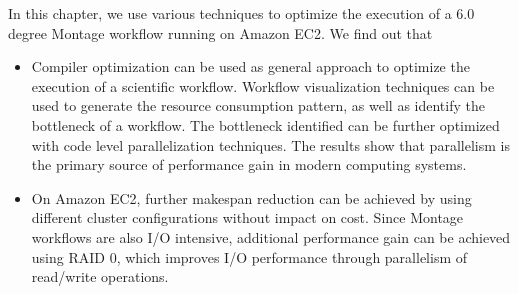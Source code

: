 In this chapter, we use various techniques to optimize the execution of a 6.0 degree Montage workflow running on Amazon EC2. We find out that 

\begin{itemize}
	\item Compiler optimization can be used as general approach to optimize the execution of a scientific workflow. Workflow visualization techniques can be used to generate the resource consumption pattern, as well as identify the bottleneck of a workflow. The bottleneck identified can be further optimized with code level parallelization techniques. The results show that parallelism is the primary source of performance gain in modern computing systems.

    \item On Amazon EC2, further makespan reduction can be achieved by using different cluster configurations without impact on cost. Since Montage workflows are also I/O intensive, additional performance gain can be achieved using RAID 0, which improves I/O performance through parallelism of read/write operations.

\end{itemize}

